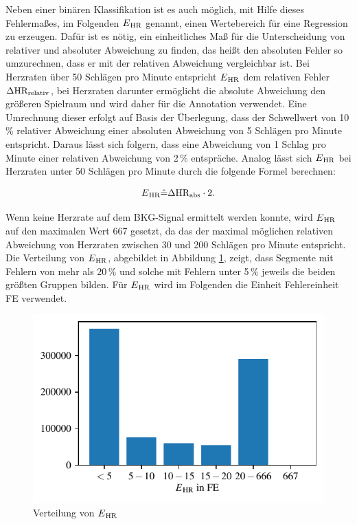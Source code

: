 	Neben einer binären Klassifikation ist es auch möglich, mit Hilfe dieses Fehlermaßes, im Folgenden $E\textsubscript{HR}$ genannt, einen Wertebereich für eine Regression zu erzeugen. Dafür ist es nötig, ein einheitliches Maß für die Unterscheidung von relativer und absoluter Abweichung zu finden, das heißt den absoluten Fehler so umzurechnen, dass er mit der relativen Abweichung vergleichbar ist. Bei Herzraten über 50 Schlägen pro Minute entspricht $E\textsubscript{HR}$ dem relativen Fehler $\Delta\text{HR}\textsubscript{relativ}$, bei Herzraten darunter ermöglicht die absolute Abweichung den größeren Spielraum und wird daher für die Annotation verwendet. Eine Umrechnung dieser erfolgt auf Basis der Überlegung, dass der Schwellwert von 10\,\% relativer Abweichung einer absoluten Abweichung von 5 Schlägen pro Minute entspricht. Daraus lässt sich folgern, dass eine Abweichung von 1 Schlag pro Minute einer relativen Abweichung von 2\,\% entspräche. Analog lässt sich $E\textsubscript{HR}$ bei Herzraten unter 50 Schlägen pro Minute durch die folgende Formel berechnen:
	
	\begin{align*}
		E\textsubscript{HR} \hat{=} \Delta\text{HR}\textsubscript{abs} \cdot 2.
	\end{align*}
	
	Wenn keine Herzrate auf dem \ac{BKG}-Signal ermittelt werden konnte, wird $E\textsubscript{HR}$ auf den maximalen Wert 667 gesetzt, da das der maximal möglichen relativen Abweichung von Herzraten zwischen 30 und 200 Schlägen pro Minute entspricht. Die Verteilung von $E\textsubscript{HR}$, abgebildet in Abbildung \ref{fig:class-histo}, zeigt, dass Segmente mit Fehlern von mehr als 20\,\% und solche mit Fehlern unter 5\,\% jeweils die beiden größten Gruppen bilden. Für $E\textsubscript{HR}$ wird im Folgenden die Einheit Fehlereinheit \si{FE} verwendet.
	
	
	\begin{figure}[H]
		\centering
		\includegraphics{pic/data-E-HR-bar.pdf}
		\caption[Verteilung von $E\textsubscript{HR}$]{Verteilung von $E\textsubscript{HR}$}
		\label{fig:class-histo}
	\end{figure}
	
	
	